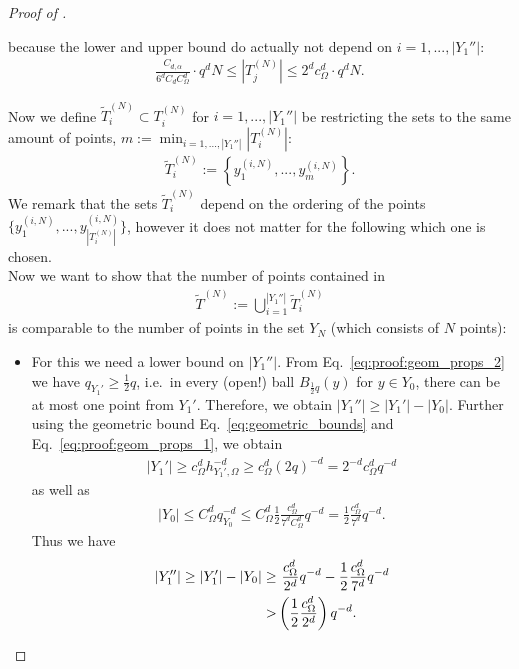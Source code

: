 \documentclass[a4paper, 10pt]{article}
\begin{document}
\begin{proof}[Proof of ]
\begin{itemize}
because the lower and upper bound do actually not depend on $i = 1, ..., |Y_1''|$:
\begin{align}
\label{eq:subset_size_asymp}
\frac{C_{d, \alpha}}{6^d C_d C_\Omega^d} \cdot q^d N \leq 
\left| T_j^{(N)} \right| 
\leq 2^d c_\Omega^d \cdot q^d N.
\end{align}
\end{itemize}
Now we define $\tilde{T}_i^{(N)} \subset T_i^{(N)}$ for $i=1, ..., |Y_1''|$ be restricting the sets to the same amount of points, $m := \min_{i=1, ..., |Y_1''|} |T_i^{(N)}|$:
\begin{align}
\label{eq:proof:definition_TiN_tilde}
\tilde{T}_i^{(N)} := \left\{ y_1^{(i, N)}, ..., y_m^{(i, N)} \right\}.
\end{align}
We remark that the sets $\tilde{T}_i^{(N)}$ depend on the ordering of the points $\{ y_1^{(i, N)}, ..., y_{|T_i^{(N)}|}^{(i, N)} \}$, however it does not matter for the following which one is chosen. \\
Now we want to show that the number of points contained in 
\begin{align*}
\tilde{T}^{(N)} := \bigcup_{i=1}^{|Y_1''|} \tilde{T}_i^{(N)}
\end{align*}
is comparable to the number of points in the set $Y_N$ (which consists of $N$ points):
\begin{itemize}
\item For this we need a lower bound on $|Y_1''|$.
From Eq.\ \eqref{eq:proof:geom_props_2} we have $q_{Y_1'} \geq \frac{1}{2}q$, i.e.\ in every (open!) ball $B_{\frac{1}{2} q}(y)$ for $y \in Y_0$, there can be at most one point from $Y_1'$.
Therefore, we obtain $|Y_1''| \geq |Y_1'| - |Y_0|$.
Further using the geometric bound Eq.~\eqref{eq:geometric_bounds} and Eq.~\eqref{eq:proof:geom_props_1}, we obtain
\begin{align*}
|Y_1'| \geq c_\Omega^{d} h_{Y_1', \Omega}^{-d} \geq c_\Omega^d (2q)^{-d} = 2^{-d} c_\Omega^d q^{-d} 
%
\end{align*}
as well as
\begin{align*}
|Y_0| \leq C_\Omega^d q_{Y_0}^{-d} \leq C_\Omega^d \frac{1}{2} \frac{c_\Omega^d}{7^d C_\Omega^d} q^{-d} 
= \frac{1}{2} \frac{c_\Omega^d}{7^d} q^{-d}.
\end{align*}
Thus we have
\begin{align}
\label{eq:lower_bound_Y1''}
|Y_1''| \geq |Y_1'| - |Y_0| \geq& ~ \frac{c_\Omega^d}{2^d} q^{-d} - \frac{1}{2} \frac{c_\Omega^d}{7^d} q^{-d} \notag \\
>& \left( \frac{1}{2} \frac{c_\Omega^d}{2^d} \right) q^{-d}.

\end{align}
\end{itemize}
\end{proof}
\end{document}

